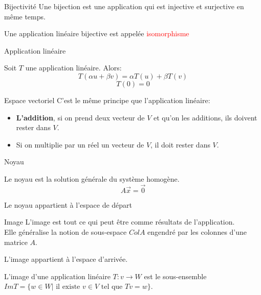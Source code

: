 \begin{parag}{Bijectivité}
    Une bijection est une application qui est injective et surjective en même temps.
    \begin{definition}
        Une application linéaire bijective est appelée \textcolor{red}{isomorphisme}
    \end{definition}
\end{parag}
\begin{parag}{Application linéaire}
    \begin{truc}
        Soit $T$ une application linéaire. Alors:
        \[T(\alpha u + \beta v) = \alpha T(u) + \beta T(v)\]
        \[T(0) = 0\]
    \end{truc}
\end{parag}

\begin{parag}{Espace vectoriel}
    C'est le même principe que l'application linéaire:
    \begin{itemize}
        \item \textbf{L'addition}, si on prend deux vecteur de $V$ et qu'on les additions, ils doivent rester dans $V$.
        \item Si on multiplie par un réel un vecteur de $V$, il doit rester dans $V$.
    \end{itemize}
    
\end{parag}


\begin{parag}{Noyau}
    \begin{truc}
        Le noyau est la solution générale du système homogène.
        \[A\vec{x} = \vec{0} \]
    \end{truc}
    \begin{truc}
        Le noyau appartient à l'espace de départ 
    \end{truc}
\end{parag}
    
\begin{parag}{Image}
    L'image est tout ce qui peut être comme résultats de l'application.\\
    Elle généralise la notion de sous-espace $ColA$ engendré par les colonnes d'une matrice $A$.
    \begin{truc}
        L'image appartient à l'espace d'arrivée.
    \end{truc}
    \begin{truc}
        L'image d'une application linéaire $T: v \to W$ est le sous-ensemble $ImT = \{ w \in W| \text{ il existe } v \in V \text{ tel que } Tv = w\}$.
    \end{truc}
    
\end{parag}

